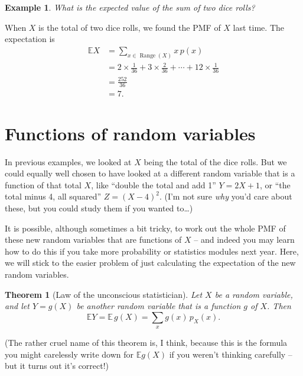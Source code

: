 \documentclass[
  a4paper,
]{book}
\newtheorem{theorem}{Theorem}[chapter]
\theoremstyle{definition}
\theoremstyle{definition}
\newtheorem{example}{Example}[chapter]
\theoremstyle{definition}
\theoremstyle{definition}
\theoremstyle{remark}
\begin{document}
\begin{example}
\emph{What is the expected value of the sum of two dice rolls?}

When \(X\) is the total of two dice rolls, we found the PMF of \(X\) last time. The expectation is
\begin{align*}
  \mathbb EX &= \sum_{x \in \operatorname{Range}(X)} x\,p(x)  \\
    &= 2 \times \tfrac{1}{36} + 3 \times \tfrac{2}{36} + \cdots + 12 \times \tfrac{1}{36} \\
    &= \tfrac{252}{36} \\
    &= 7 .
\end{align*}
\end{example}

\hypertarget{functions}{%
\section{Functions of random variables}\label{functions}}

In previous examples, we looked at \(X\) being the total of the dice rolls. But we could equally well chosen to have looked at a different random variable that is a function of that total \(X\), like ``double the total and add 1'' \(Y = 2X + 1\), or ``the total minus 4, all squared'' \(Z = (X-4)^2\). (I'm not sure \emph{why} you'd care about these, but you could study them if you wanted to\ldots)

It is possible, although sometimes a bit tricky, to work out the whole PMF of these new random variables that are functions of \(X\) -- and indeed you may learn how to do this if you take more probability or statistics modules next year. Here, we will stick to the easier problem of just calculating the expectation of the new random variables.

\begin{theorem}[Law of the unconscious statistician]
\protect\hypertarget{thm:unconscious}{}\label{thm:unconscious}Let \(X\) be a random variable, and let \(Y = g(X)\) be another random variable that is a function \(g\) of \(X\). Then
\[  \mathbb EY = \mathbb E\,g(X) = \sum_{x} g(x) \, p_X(x) . \]
\end{theorem}

(The rather cruel name of this theorem is, I think, because this is the formula you might carelessly write down for \(\mathbb Eg(X)\) if you weren't thinking carefully -- but it turns out it's correct!)
\end{document}
